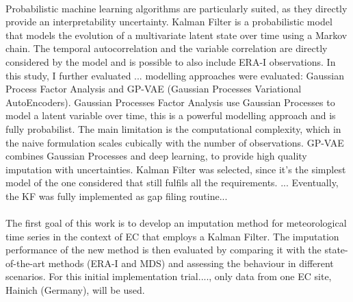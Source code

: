 \documentclass{article}
\begin{document}
\paragraph{}  Probabilistic machine learning algorithms are particularly suited, as they directly provide an interpretability uncertainty.
Kalman Filter is a probabilistic model that models the evolution of a multivariate latent state over time using a Markov chain. The temporal autocorrelation and the variable correlation are directly considered by the model and is possible to also include ERA-I observations.
In this study, I further evaluated  ... modelling approaches were evaluated: Gaussian Process Factor Analysis and GP-VAE (Gaussian Processes Variational AutoEncoders). Gaussian Processes Factor Analysis \cite{yu_gaussian-process_2008} use Gaussian Processes to model a latent variable over time, this is a powerful modelling approach and is fully probabilist. The main limitation is the computational complexity, which in the naive formulation scales cubically with the number of observations.
GP-VAE \cite{fortuin_gp-vae_2020} combines Gaussian Processes and deep learning, to provide high quality imputation with uncertainties.
Kalman Filter was selected, since it's the simplest model of the one considered that still fulfils all the requirements. ... Eventually, the KF was fully implemented as gap filing routine...



\paragraph{} The first goal of this work is to develop an imputation method for meteorological time series in the context of EC that employs a Kalman Filter. The imputation performance of the new method is then evaluated by comparing it with the state-of-the-art methods (ERA-I and MDS) and assessing the behaviour in different scenarios. For this initial implementation trial...., only data from one EC site, Hainich (Germany), will be used.
\end{document}
